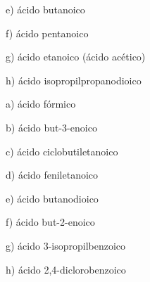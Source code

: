 \documentclass{article}
\begin{document}
e) 
ácido butanoico

f) 
ácido pentanoico

g) 
ácido etanoico (ácido acético)

h)
ácido isopropilpropanodioico

a) ácido fórmico

b) ácido but-3-enoico

c) ácido ciclobutiletanoico

d) ácido feniletanoico

e) ácido butanodioico

f) ácido but-2-enoico

g) ácido 3-isopropilbenzoico

h) ácido 2,4-diclorobenzoico
\end{document}
